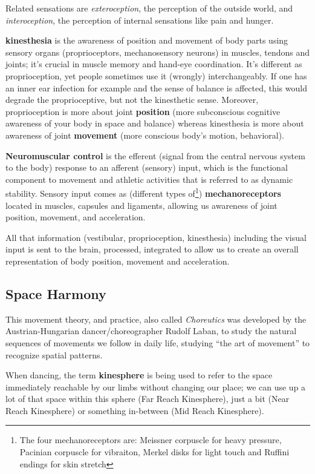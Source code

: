 Related sensations are \textit{exteroception}, the perception of the outside world, and \textit{interoception}, the perception of internal sensations like pain and hunger.

\textbf{\Gls{kinesthesia}} is the awareness of position and movement of body parts using sensory organs (proprioceptors, mechanosensory neurons) in muscles, tendons and joints; it's crucial in muscle memory and hand-eye coordination.
It's different as proprioception, yet people sometimes use it (wrongly) interchangeably.
If one has an inner ear infection for example and the sense of balance is affected, this would degrade the proprioceptive, but not the kinesthetic sense.
Moreover, proprioception is more about joint \textbf{position} (more subconscious cognitive awareness of your body in space and balance) whereas kinesthesia is more about awareness of joint \textbf{movement} (more conscious body's motion, behavioral).

\textbf{Neuromuscular control} is the efferent (signal from the central nervous system to the body) response to an afferent (sensory) input, which is the functional component to movement and athletic activities that is referred to as dynamic stability.
Sensory input comes as (different types of\footnote{The four mechanoreceptors are: Meissner corpuscle for heavy pressure, Pacinian corpuscle for vibraiton, Merkel disks for light touch and Ruffini endings for skin stretch}) \textbf{mechanoreceptors} located in muscles, capsules and ligaments, allowing us awareness of joint position, movement, and acceleration.

All that information (vestibular, proprioception, kinesthesia) including the visual input is sent to the brain, processed, integrated to allow us to create an overall representation of body position, movement and acceleration.

\subsection{Space Harmony}\label{subsec:space-harmony}

This movement theory, and practice, also called \textit{Choreutics} was developed by the Austrian-Hungarian dancer/choreographer Rudolf Laban, to study the natural sequences of movements we follow in daily life, studying ``the art of movement'' to recognize spatial patterns.

When dancing, the term \textbf{\gls{kinesphere}} is being used to refer to the space immediately reachable by our limbs without changing our place; we can use up a lot of that space within this sphere (Far Reach Kinesphere), just a bit (Near Reach Kinesphere) or something in-between (Mid Reach Kinesphere).

